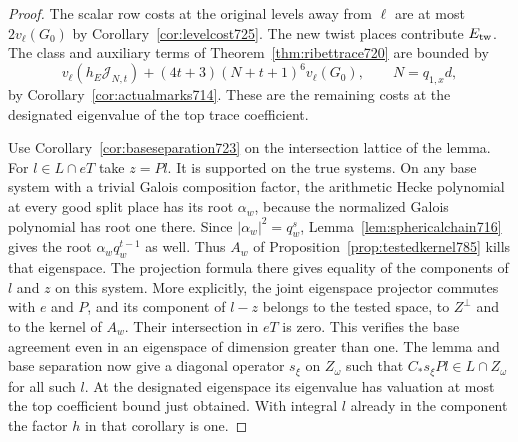 \documentclass[a4paper,11pt]{article}
\theoremstyle{definition}
\theoremstyle{remark}
\numberwithin{equation}{section}
\begin{document}
\begin{proof}
The scalar row costs at the original levels away from \(\ell\)
are at most \(2v_\ell(G_0)\) by Corollary~\ref{cor:levelcost725}.
The new twist places contribute \(E_{\rm tw}\). The class and
auxiliary terms of Theorem~\ref{thm:ribettrace720} are bounded by
\[
    v_\ell(h_E\mathcal J_{N,t})+
                (4t+3)(N+t+1)^6 v_\ell(G_0),
           \qquad N=q_{1,x}d,
\]
by Corollary~\ref{cor:actualmarks714}. These are the remaining
costs at the designated eigenvalue of the top trace coefficient.

Use Corollary~\ref{cor:baseseparation723} on the intersection
lattice of the lemma. For \(l\in L\cap eT\) take \(z=Pl\).
It is supported on the true systems. On any base system with a
trivial Galois composition factor, the arithmetic Hecke polynomial
at every good split place has its root \(\alpha_w\), because the
normalized Galois polynomial has root one there. Since
\(|\alpha_w|^2=q_w^s\), Lemma~\ref{lem:sphericalchain716} gives
the root \(\alpha_wq_w^{t-1}\) as well. Thus \(A_w\) of
Proposition~\ref{prop:testedkernel785} kills that eigenspace.
The projection formula there gives equality of the components of
\(l\) and \(z\) on this system. More explicitly, the joint
eigenspace projector commutes with \(e\) and \(P\), and its
component of \(l-z\) belongs to the tested space, to \(Z^\perp\)
and to the kernel of \(A_w\). Their intersection in \(eT\) is
zero. This verifies the base agreement even in an eigenspace
of dimension greater than one. The lemma and base separation
now give a diagonal operator \(s_\xi\) on \(Z_\omega\) such
that \(C_*s_\xi Pl\in L\cap Z_\omega\) for all such \(l\).
At the designated eigenspace its eigenvalue has valuation at
most the top coefficient bound just obtained. With integral
\(l\) already in the component the factor \(h\) in that
corollary is one.


\end{proof}
\end{document}
